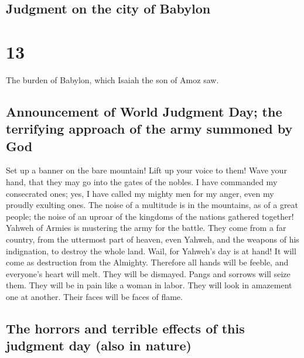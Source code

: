 \hypertarget{judgment-on-the-city-of-babylon}{%
\subsection{Judgment on the city of
Babylon}\label{judgment-on-the-city-of-babylon}}

\hypertarget{section-12}{%
\section{13}\label{section-12}}

 The burden of Babylon, which Isaiah the son of Amoz saw.

\hypertarget{announcement-of-world-judgment-day-the-terrifying-approach-of-the-army-summoned-by-god}{%
\subsection{Announcement of World Judgment Day; the terrifying approach
of the army summoned by
God}\label{announcement-of-world-judgment-day-the-terrifying-approach-of-the-army-summoned-by-god}}

 Set up a banner on the bare mountain! Lift up your voice
to them! Wave your hand, that they may go into the gates of the nobles.
 I have commanded my consecrated ones; yes, I have called
my mighty men for my anger, even my proudly exulting ones.
 The noise of a multitude is in the mountains, as of a
great people; the noise of an uproar of the kingdoms of the nations
gathered together! Yahweh of Armies is mustering the army for the
battle.  They come from a far country, from the uttermost
part of heaven, even Yahweh, and the weapons of his indignation, to
destroy the whole land.  Wail, for Yahweh's day is at
hand! It will come as destruction from the Almighty. 
Therefore all hands will be feeble, and everyone's heart will melt.
 They will be dismayed. Pangs and sorrows will seize them.
They will be in pain like a woman in labor. They will look in amazement
one at another. Their faces will be faces of flame.

\hypertarget{the-horrors-and-terrible-effects-of-this-judgment-day-also-in-nature}{%
\subsection{The horrors and terrible effects of this judgment day (also
in
nature)}\label{the-horrors-and-terrible-effects-of-this-judgment-day-also-in-nature}}

